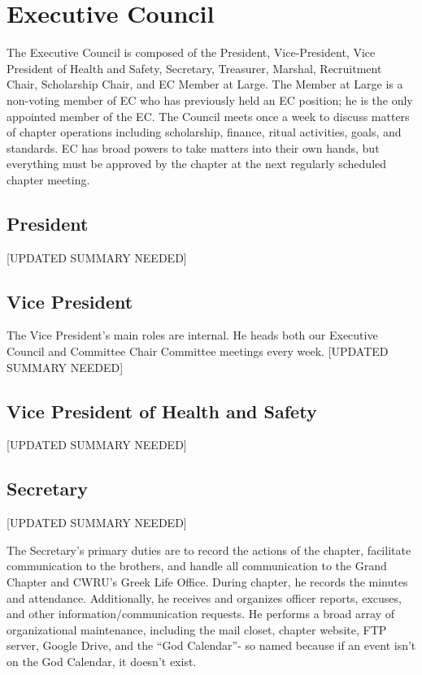     \section*{Executive Council}
      The Executive Council is composed of the President, Vice-President, Vice President of Health and Safety, Secretary, Treasurer, Marshal, Recruitment Chair, Scholarship Chair, and EC Member at Large. The Member at Large is a non-voting member of EC who has previously held an EC position; he is the only appointed member of the EC. The Council meets once a week to discuss matters of chapter operations including scholarship, finance, ritual activities, goals, and standards. EC has broad powers to take matters into their own hands, but everything must be approved by the chapter at the next regularly scheduled chapter meeting.
      
      \subsection*{President}
	[UPDATED SUMMARY NEEDED]
	
      \subsection*{Vice President}
	The Vice President's main roles are internal. He heads both our Executive Council and Committee Chair Committee meetings every week. 
	[UPDATED SUMMARY NEEDED]
	
      \subsection*{Vice President of Health and Safety}
	[UPDATED SUMMARY NEEDED]
	
      \subsection*{Secretary}
	[UPDATED SUMMARY NEEDED]
      
	The Secretary's primary duties are to record the actions of the chapter, facilitate communication to the brothers, and handle all communication to the Grand Chapter and CWRU's Greek Life Office. During chapter, he records the minutes and attendance. Additionally, he receives and organizes officer reports, excuses, and other information/communication requests. He performs a broad array of organizational maintenance, including the mail closet, chapter website, FTP server, Google Drive, and the ``God Calendar''- so named because if an event isn't on the God Calendar, it doesn't exist. \\

